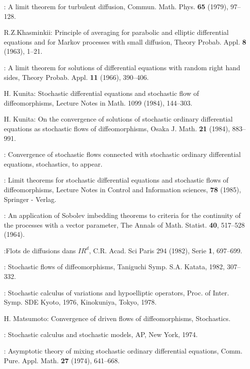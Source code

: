 \begin{thebibliography}{99}
:  A limit theorem for
  turbulent diffusion, Commun. Math. Phys. \textbf{65} (1979), 97--128. 

 {R.Z.Khasminkii}:  Principle of averaging for parabolic
  and elliptic differential equations and for Markov processes with
  small diffusion, Theory Probab. Appl. \textbf{8} (1963), 1--21. 

:  A limit theorem for solutions of
  differential equations with random right hand sides, Theory
  Probab. Appl. \textbf{11} (1966), 390--406. 

 {H. Kunita}:  Stochastic differential equations and
  stochastic flow of diffeomorphisms, Lecture Notes in Math. 1099
  (1984), 144--303. 

 {H. Kunita}:  On the convergence of solutions of
  stochastic ordinary differential equations as stochastic flows of
  diffeomorphisms, Osaka J. Math. \textbf{21} (1984), 883--991. 

:  Convergence of stochastic flows connected
  with stochastic ordinary differential equations, stochastics, to
  appear. 

:  Limit theorems for stochastic differential
  equations and stochastic flows of diffeomorphisms, Lecture Notes in
  Control and Information sciences, \textbf{78} (1985), Springer - Verlag. 

: An application of Sobolev imbedding
  theorems to criteria for the continuity of the processes with a
  vector parameter, The Annals of Math. Statist. \textbf{40}, 517--528
  (1964). 

:\pageoriginale  Flots de diffusions dans $IR^d$,
  C.R. Acad. Sci Paris 294 (1982), Serie \textbf{1}, 697--699. 

:  Stochastic flows of
  diffeomorphisms, Taniguchi Symp. S.A. Katata, 1982, 307--332. 

:  Stochastic calculus of variations and
  hypoelliptic operators, Proc. of Inter. Symp. SDE Kyoto, 1976,
  Kinokuniya, Tokyo, 1978. 

 {H. Matsumoto}:  Convergence of driven flows of
  diffeomorphisms, Stochastics. 

:  Stochastic calculus and stochastic models,
  AP, New York, 1974. 

: Asymptotic theory of
  mixing stochastic ordinary differential equations,
  Comm. Pure. Appl. Math. \textbf{27} (1974), 641--668.  


\end{thebibliography}
